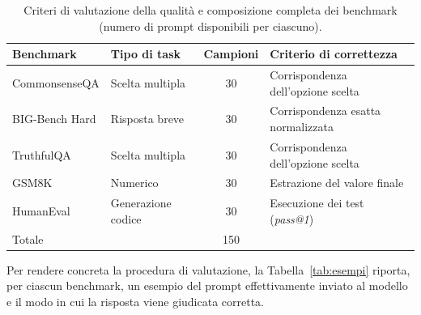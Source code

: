 \begin{table}[htbp]
    \centering
    \begin{tabularx}{\textwidth}{llcX}
        \hline
        Benchmark & Tipo di task & Campioni & Criterio di correttezza \\
        \hline
        CommonsenseQA   & Scelta multipla    & 30 & Corrispondenza dell'opzione scelta \\
        BIG-Bench Hard  & Risposta breve     & 30 & Corrispondenza esatta normalizzata \\
        TruthfulQA      & Scelta multipla    & 30 & Corrispondenza dell'opzione scelta \\
        GSM8K           & Numerico           & 30 & Estrazione del valore finale \\
        HumanEval       & Generazione codice & 30 & Esecuzione dei test (\textit{pass@1}) \\
        \hline
        \multicolumn{2}{l}{Totale} & 150 & \\
        \hline
    \end{tabularx}
    \caption{Criteri di valutazione della qualità e composizione completa dei
    benchmark (numero di prompt disponibili per ciascuno).}
    \label{tab:scoring}
\end{table}

Per rendere concreta la procedura di valutazione, la Tabella~\ref{tab:esempi} riporta,
per ciascun benchmark, un esempio del prompt effettivamente inviato al modello e il
modo in cui la risposta viene giudicata corretta.

